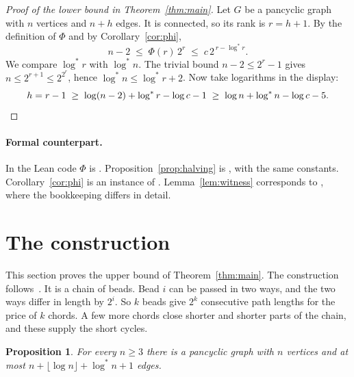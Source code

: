 \documentclass[11pt]{article}
\newtheorem{proposition}[theorem]{Proposition}
\theoremstyle{definition}
\theoremstyle{remark}
\newcommand{\lgs}{\log^{*}}
\numberwithin{equation}{section}
\begin{document}
\begin{proof}[Proof of the lower bound in Theorem~\ref{thm:main}]
Let $G$ be a pancyclic graph with $n$ vertices and $n+h$ edges. It is connected, so its rank is
$r=h+1$. By the definition of $\Phi$ and by Corollary~\ref{cor:phi},
\[
  n-2\;\le\;\Phi(r)\,2^{r}\;\le\;c\,2^{\,r-\lgs r}.
\]
We compare $\lgs r$ with $\lgs n$. The trivial bound $n-2\le2^{r}-1$ gives
$n\le2^{r+1}\le2^{2^{r}}$, hence $\lgs n\le\lgs r+2$. Now take logarithms in the display:
\[
  h=r-1\;\ge\;\log(n-2)+\lgs r-\log c-1\;\ge\;\log n+\lgs n-\log c-5.\qedhere
\]
\end{proof}

\paragraph{Formal counterpart.}
In the Lean code $\Phi$ is . Proposition~\ref{prop:halving} is
, with the same constants.
Corollary~\ref{cor:phi} is an instance of . Lemma~\ref{lem:witness}
corresponds to , where the bookkeeping differs in detail.
\section{The construction}\label{sec:upper}

This section proves the upper bound of Theorem~\ref{thm:main}. The construction follows~\cite{KNT}.
It is a chain of beads. Bead $i$ can be passed in two ways, and the two ways differ in length by
$2^{i}$. So $k$ beads give $2^{k}$ consecutive path lengths for the price of $k$ chords. A few more
chords close shorter and shorter parts of the chain, and these supply the short cycles.

\begin{proposition}\label{prop:upper}
For every $n\ge3$ there is a pancyclic graph with $n$ vertices and at most
$n+\lfloor\log n\rfloor+\lgs n+1$ edges.
\end{proposition}
\end{document}
